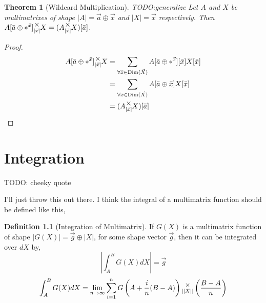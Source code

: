 \documentclass[12pt]{book}
\theoremstyle{plain}
\newtheorem{theorem}{Theorem}[chapter]
\theoremstyle{definition}
\newtheorem{definition}{Definition}[chapter]
\theoremstyle{ppart}
\theoremstyle{case}
\theoremstyle{solution}
\DeclareMathOperator{\Dim}{Dim}
\newcommand{\mmult}[1]{\text{\raisebox{1ex}{$\underset{#1}{\times}$}}}
\newcommand{\shape}[1]{\left|#1\right|}
\begin{document}
\begin{theorem}[Wildcard Multiplication]
TODO:generalize
Let $A$ and $X$ be multimatrixes of shape $\shape{A} = \vec{a} \oplus \vec{x}$ and $\shape{X} = \vec{x}$ respectively.
Then $A[\bar{a} \oplus *^{\vec{x}}] \mmult{\shape{\vec{x}}} X = (A \mmult{\shape{\vec{x}}} X)[\bar{a}]$.
\end{theorem}
\begin{proof}
\begin{align*}
  A[\bar{a} \oplus *^{\vec{x}}] \mmult{\shape{\vec{x}}} X
  &=
  \sum_{\forall \bar{x} \in \Dim(\vec{X})} A[\bar{a} \oplus *^{\vec{x}}][\bar{x}] X[\bar{x}] \\
  &=
  \sum_{\forall \bar{x} \in \Dim(\vec{X})} A[\bar{a} \oplus \bar{x}] X[\bar{x}] \\
  &= (A \mmult{\shape{\vec{x}}} X)[\bar{a}]
\end{align*}
\end{proof}


\chapter{Integration}

\begin{displayquote}
TODO: cheeky quote
\end{displayquote}

I'll just throw this out there. I think the integral of a multimatrix function should
be defined like this,

\begin{definition}[Integration of Multimatrix]
If $G(X)$ is a multimatrix function of shape $\shape{G(X)} = \vec{g} \oplus \shape{X}$,
for some shape vector $\vec{g}$, then it can be integrated over $dX$ by,
\[ \shape{\int_A^B G(X) dX} = \vec{g} \]
\[
 \int_A^B G(X) dX = \lim_{n \to \infty}
 \sum_{i=1}^n
  G\left(A+\frac{i}{n}(B-A)\right)
  \mmult{\shape{\shape{X}}}
  \left(\frac{B-A}{n}\right)
\]
\end{definition}
\end{document}
